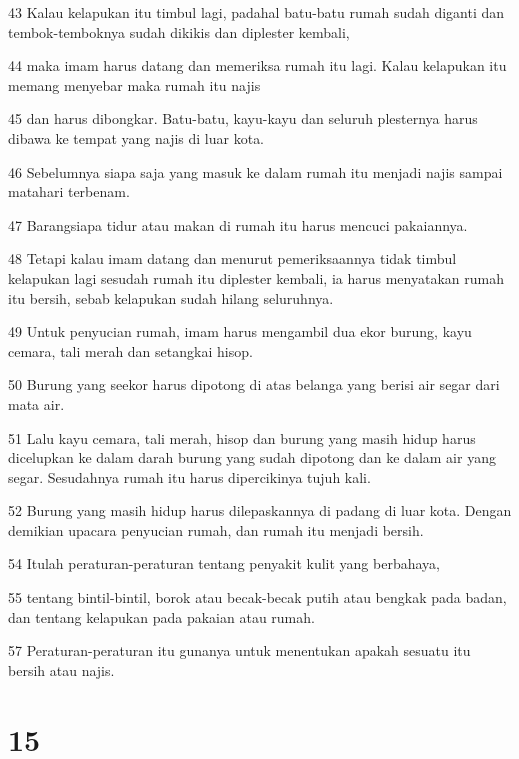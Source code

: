 \par 43 Kalau kelapukan itu timbul lagi, padahal batu-batu rumah sudah diganti dan tembok-temboknya sudah dikikis dan diplester kembali,
\par 44 maka imam harus datang dan memeriksa rumah itu lagi. Kalau kelapukan itu memang menyebar maka rumah itu najis
\par 45 dan harus dibongkar. Batu-batu, kayu-kayu dan seluruh plesternya harus dibawa ke tempat yang najis di luar kota.
\par 46 Sebelumnya siapa saja yang masuk ke dalam rumah itu menjadi najis sampai matahari terbenam.
\par 47 Barangsiapa tidur atau makan di rumah itu harus mencuci pakaiannya.
\par 48 Tetapi kalau imam datang dan menurut pemeriksaannya tidak timbul kelapukan lagi sesudah rumah itu diplester kembali, ia harus menyatakan rumah itu bersih, sebab kelapukan sudah hilang seluruhnya.
\par 49 Untuk penyucian rumah, imam harus mengambil dua ekor burung, kayu cemara, tali merah dan setangkai hisop.
\par 50 Burung yang seekor harus dipotong di atas belanga yang berisi air segar dari mata air.
\par 51 Lalu kayu cemara, tali merah, hisop dan burung yang masih hidup harus dicelupkan ke dalam darah burung yang sudah dipotong dan ke dalam air yang segar. Sesudahnya rumah itu harus dipercikinya tujuh kali.
\par 52 Burung yang masih hidup harus dilepaskannya di padang di luar kota. Dengan demikian upacara penyucian rumah, dan rumah itu menjadi bersih.
\par 54 Itulah peraturan-peraturan tentang penyakit kulit yang berbahaya,
\par 55 tentang bintil-bintil, borok atau becak-becak putih atau bengkak pada badan, dan tentang kelapukan pada pakaian atau rumah.
\par 57 Peraturan-peraturan itu gunanya untuk menentukan apakah sesuatu itu bersih atau najis.

\chapter{15}

